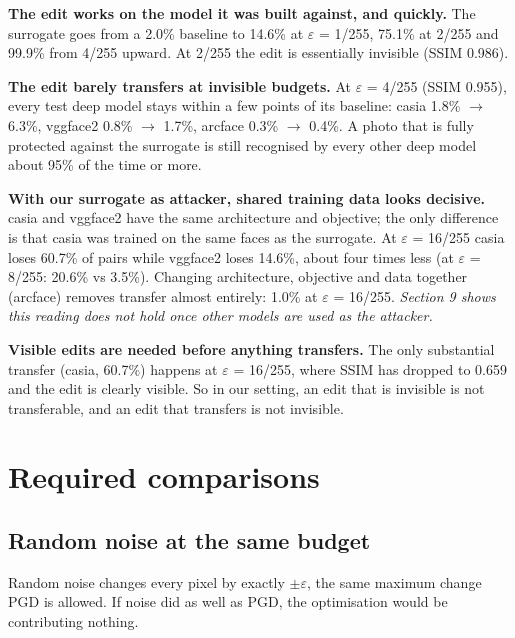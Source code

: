 \documentclass[10pt,a4paper]{article}
\begin{document}
\textbf{The edit works on the model it was built against, and quickly.} The surrogate goes from a 2.0\% baseline to 14.6\% at $\varepsilon$ = 1/255, 75.1\% at 2/255 and 99.9\% from 4/255 upward. At 2/255 the edit is essentially invisible (SSIM 0.986).


\textbf{The edit barely transfers at invisible budgets.} At $\varepsilon$ = 4/255 (SSIM 0.955), every test deep model stays within a few points of its baseline: casia 1.8\% $\to$ 6.3\%, vggface2 0.8\% $\to$ 1.7\%, arcface 0.3\% $\to$ 0.4\%. A photo that is fully protected against the surrogate is still recognised by every other deep model about 95\% of the time or more.


\textbf{With our surrogate as attacker, shared training data looks decisive.} casia and vggface2 have the same architecture and objective; the only difference is that casia was trained on the same faces as the surrogate. At $\varepsilon$ = 16/255 casia loses 60.7\% of pairs while vggface2 loses 14.6\%, about four times less (at $\varepsilon$ = 8/255: 20.6\% vs 3.5\%). Changing architecture, objective and data together (arcface) removes transfer almost entirely: 1.0\% at $\varepsilon$ = 16/255. \emph{Section 9 shows this reading does not hold once other models are used as the attacker.}


\textbf{Visible edits are needed before anything transfers.} The only substantial transfer (casia, 60.7\%) happens at $\varepsilon$ = 16/255, where SSIM has dropped to 0.659 and the edit is clearly visible. So in our setting, an edit that is invisible is not transferable, and an edit that transfers is not invisible.


\clearpage

\section{Required comparisons}

\subsection{Random noise at the same budget}

Random noise changes every pixel by exactly $\pm$$\varepsilon$, the same maximum change PGD is allowed. If noise did as well as PGD, the optimisation would be contributing nothing.
\end{document}
